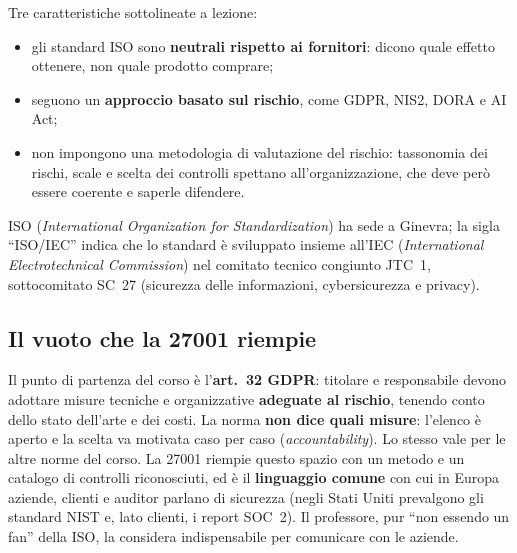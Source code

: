Tre caratteristiche sottolineate a lezione:
\begin{itemize}
  \item gli standard ISO sono \textbf{neutrali rispetto ai fornitori}: dicono quale effetto ottenere, non quale
    prodotto comprare;
  \item seguono un \textbf{approccio basato sul rischio}, come GDPR, NIS2, DORA e AI Act;
  \item non impongono una metodologia di valutazione del rischio: tassonomia dei rischi, scale e scelta dei
    controlli spettano all'organizzazione, che deve però essere coerente e saperle difendere.
\end{itemize}

\begin{integrazione}
ISO (\emph{International Organization for Standardization}) ha sede a Ginevra; la sigla ``ISO/IEC'' indica
che lo standard è sviluppato insieme all'IEC (\emph{International Electrotechnical Commission}) nel comitato
tecnico congiunto JTC~1, sottocomitato SC~27 (sicurezza delle informazioni, cybersicurezza e privacy).
\end{integrazione}

\subsection{Il vuoto che la 27001 riempie}
Il punto di partenza del corso è l'\textbf{art.~32 GDPR}: titolare e responsabile devono adottare misure
tecniche e organizzative \textbf{adeguate al rischio}, tenendo conto dello stato dell'arte e dei costi. La
norma \textbf{non dice quali misure}: l'elenco è aperto e la scelta va motivata caso per caso
(\emph{accountability}). Lo stesso vale per le altre norme del corso. La 27001 riempie questo spazio con un
metodo e un catalogo di controlli riconosciuti, ed è il \textbf{linguaggio comune} con cui in Europa aziende,
clienti e auditor parlano di sicurezza (negli Stati Uniti prevalgono gli standard NIST e, lato clienti, i
report SOC~2). Il professore, pur ``non essendo un fan'' della ISO, la considera indispensabile per
comunicare con le aziende.

